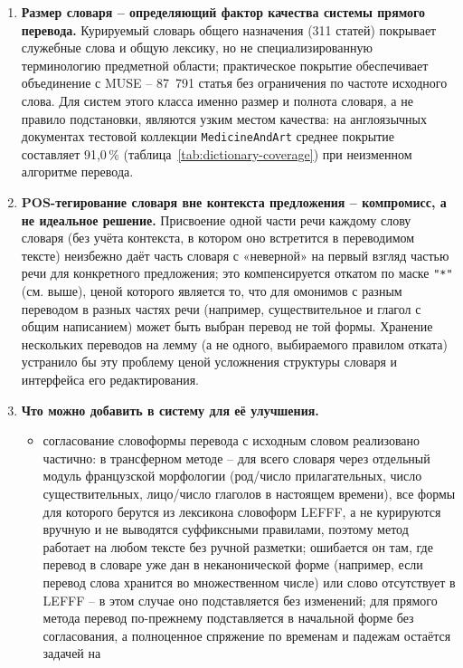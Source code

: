 \begin{enumerate}
  \item \textbf{Размер словаря -- определяющий фактор качества системы
  прямого перевода.} Курируемый словарь общего назначения (311 статей)
  покрывает служебные слова и общую лексику, но не специализированную
  терминологию предметной области; практическое покрытие обеспечивает
  объединение с MUSE -- 87~791 статья без ограничения по частоте
  исходного слова. Для систем этого класса именно размер и полнота
  словаря, а не правило подстановки, являются узким местом качества:
  на англоязычных документах тестовой коллекции \texttt{MedicineAndArt}
  среднее покрытие составляет 91{,}0\,\%
  (таблица~\ref{tab:dictionary-coverage}) при неизменном алгоритме
  перевода.
  \item \textbf{POS-тегирование словаря вне контекста предложения --
  компромисс, а не идеальное решение.} Присвоение одной части речи
  каждому слову словаря (без учёта контекста, в котором оно встретится
  в переводимом тексте) неизбежно даёт часть словаря с «неверной» на
  первый взгляд частью речи для конкретного предложения; это компенсируется
  откатом по маске \texttt{"*"} (см. выше), ценой которого является то,
  что для омонимов с разным переводом в разных частях речи (например,
  существительное и глагол с общим написанием) может быть выбран
  перевод не той формы. Хранение нескольких переводов на лемму
  (а не одного, выбираемого правилом отката) устранило бы эту
  проблему ценой усложнения структуры словаря и интерфейса его
  редактирования.
  \item \textbf{Что можно добавить в систему для её улучшения.}
  \begin{itemize}
    \item согласование словоформы перевода с исходным словом реализовано
    частично: в трансферном методе -- для всего словаря через отдельный
    модуль французской морфологии (род/число прилагательных, число
    существительных, лицо/число глаголов в настоящем времени), все формы
    для которого берутся из лексикона словоформ LEFFF, а не курируются
    вручную и не выводятся суффиксными правилами, поэтому метод работает
    на любом тексте без ручной разметки; ошибается он там, где перевод в
    словаре уже дан в неканонической форме (например, если перевод слова
    хранится во множественном числе) или слово отсутствует в LEFFF -- в
    этом случае оно подставляется без изменений; для прямого метода
    перевод по-прежнему подставляется в начальной форме без согласования,
    а полноценное спряжение по временам и падежам остаётся задачей на

\end{itemize}
\end{enumerate}
